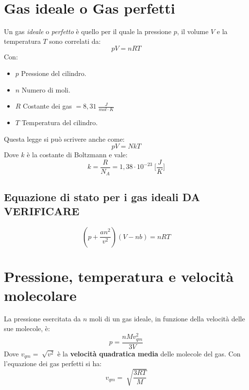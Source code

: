     \section{Gas ideale o Gas perfetti} Un gas \textit{ideale} o \textit{
        perfetto} è quello per il quale la pressione $p$, il volume $V$ e la 
        temperatura $T$ sono correlati da:
        \begin{equation}
            pV = nRT
        \end{equation}
    Con:
        \begin{itemize}
            \item $p$ Pressione del cilindro.
            \item $n$ Numero di moli.
            \item $R$ Costante dei gas $= 8,31 \; \frac{J}{mol \cdot K}$
            \item $T$ Temperatura del cilindro.
        \end{itemize}
    Questa legge si può scrivere anche come:
        \begin{equation}
            pV = NkT
        \end{equation}
    Dove $k$ è la costante di Boltzmann e vale:
        \begin{equation*}
            k = \frac{R}{N_A} = 1,38 \cdot 10^{-23} \; \Bigg[\frac{J}{K}\Bigg]
        \end{equation*}
        \subsection{Equazione di stato per i gas ideali DA VERIFICARE}
            \begin{equation}
                (p + \frac{an^2}{v^2})(V - nb) = nRT
            \end{equation}

    \section{Pressione, temperatura e velocità molecolare} La pressione 
    esercitata da $n$ moli di un gas ideale, in funzione della velocità delle
    sue molecole, è:
            \begin{equation}
                p = \frac{nMv^2_{qm}}{3V}
            \end{equation}
    Dove $v_{qm} = \sqrt[]{v^2}$ è la \textbf{velocità quadratica media} delle
    molecole del gas. Con l'equazione dei gas perfetti si ha:
            \begin{equation}
                v_{qm} = \sqrt[]{\frac{3RT}{M}}
            \end{equation}